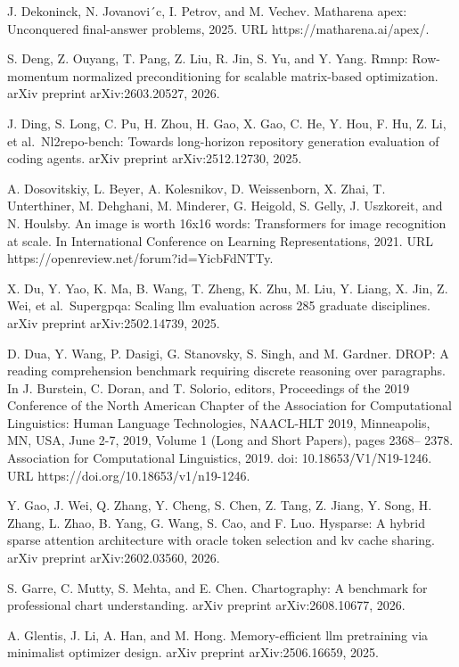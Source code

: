 \documentclass[
  10
]{article}
\begin{document}
J. Dekoninck, N. Jovanovi´c, I. Petrov, and M. Vechev. Matharena apex:
Unconquered final-answer problems, 2025. URL https://matharena.ai/apex/.

S. Deng, Z. Ouyang, T. Pang, Z. Liu, R. Jin, S. Yu, and Y. Yang. Rmnp:
Row-momentum normalized preconditioning for scalable matrix-based
optimization. arXiv preprint arXiv:2603.20527, 2026.

J. Ding, S. Long, C. Pu, H. Zhou, H. Gao, X. Gao, C. He, Y. Hou, F. Hu,
Z. Li, et al.~Nl2repo-bench: Towards long-horizon repository generation
evaluation of coding agents. arXiv preprint arXiv:2512.12730, 2025.

A. Dosovitskiy, L. Beyer, A. Kolesnikov, D. Weissenborn, X. Zhai, T.
Unterthiner, M. Dehghani, M. Minderer, G. Heigold, S. Gelly, J.
Uszkoreit, and N. Houlsby. An image is worth 16x16 words: Transformers
for image recognition at scale. In International Conference on Learning
Representations, 2021. URL https://openreview.net/forum?id=YicbFdNTTy.

X. Du, Y. Yao, K. Ma, B. Wang, T. Zheng, K. Zhu, M. Liu, Y. Liang, X.
Jin, Z. Wei, et al.~Supergpqa: Scaling llm evaluation across 285
graduate disciplines. arXiv preprint arXiv:2502.14739, 2025.



D. Dua, Y. Wang, P. Dasigi, G. Stanovsky, S. Singh, and M. Gardner.
DROP: A reading comprehension benchmark requiring discrete reasoning
over paragraphs. In J. Burstein, C. Doran, and T. Solorio, editors,
Proceedings of the 2019 Conference of the North American Chapter of the
Association for Computational Linguistics: Human Language Technologies,
NAACL-HLT 2019, Minneapolis, MN, USA, June 2-7, 2019, Volume 1 (Long and
Short Papers), pages 2368-- 2378. Association for Computational
Linguistics, 2019. doi: 10.18653/V1/N19-1246. URL
https://doi.org/10.18653/v1/n19-1246.

Y. Gao, J. Wei, Q. Zhang, Y. Cheng, S. Chen, Z. Tang, Z. Jiang, Y. Song,
H. Zhang, L. Zhao, B. Yang, G. Wang, S. Cao, and F. Luo. Hysparse: A
hybrid sparse attention architecture with oracle token selection and kv
cache sharing. arXiv preprint arXiv:2602.03560, 2026.

S. Garre, C. Mutty, S. Mehta, and E. Chen. Chartography: A benchmark for
professional chart understanding. arXiv preprint arXiv:2608.10677, 2026.

A. Glentis, J. Li, A. Han, and M. Hong. Memory-efficient llm pretraining
via minimalist optimizer design. arXiv preprint arXiv:2506.16659, 2025.
\end{document}
